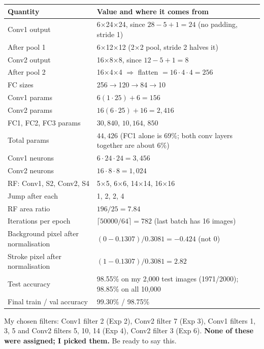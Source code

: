 \documentclass[11pt]{article}
\begin{document}
\begin{table}[h]
\centering
\begin{tabular}{p{4.6cm}p{11cm}}
\toprule
Quantity & Value and where it comes from \\
\midrule
Conv1 output & 6$\times$24$\times$24, since $28-5+1=24$ (no padding, stride 1) \\
After pool 1 & 6$\times$12$\times$12 (2$\times$2 pool, stride 2 halves it) \\
Conv2 output & 16$\times$8$\times$8, since $12-5+1=8$ \\
After pool 2 & 16$\times$4$\times$4 $\Rightarrow$ flatten $=16\cdot4\cdot4=256$ \\
FC sizes & 256$\to$120$\to$84$\to$10 \\
Conv1 params & $6(1\cdot25)+6=156$ \\
Conv2 params & $16(6\cdot25)+16=2{,}416$ \\
FC1, FC2, FC3 params & $30{,}840$, $10{,}164$, $850$ \\
Total params & $44{,}426$ (FC1 alone is 69\%; both conv layers together are about 6\%) \\
Conv1 neurons & $6\cdot24\cdot24=3{,}456$ \\
Conv2 neurons & $16\cdot8\cdot8=1{,}024$ \\
RF: Conv1, S2, Conv2, S4 & 5$\times$5, 6$\times$6, 14$\times$14, 16$\times$16 \\
Jump after each & 1, 2, 2, 4 \\
RF area ratio & $196/25=7.84$ \\
Iterations per epoch & $\lceil 50000/64\rceil=782$ (last batch has 16 images) \\
Background pixel after normalisation & $(0-0.1307)/0.3081=-0.424$ (not 0) \\
Stroke pixel after normalisation & $(1-0.1307)/0.3081=2.82$ \\
Test accuracy & 98.55\% on my 2,000 test images (1971/2000); 98.85\% on all 10,000 \\
Final train / val accuracy & 99.30\% / 98.75\% \\
\bottomrule
\end{tabular}
\end{table}

My chosen filters: Conv1 filter 2 (Exp 2), Conv2 filter 7 (Exp 3), Conv1 filters 1, 3, 5 and Conv2 filters 5, 10, 14 (Exp 4), Conv2 filter 3 (Exp 6). \textbf{None of these were assigned; I picked them.} Be ready to say this.

\end{document}
